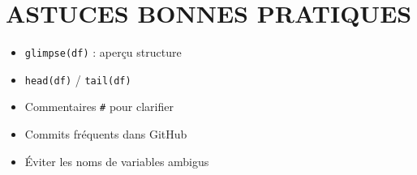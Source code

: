 \documentclass[
  french,
  8pt,
  letterpaper,
  DIV=11,
  numbers=noendperiod]{scrartcl}
\providecommand{\tightlist}{%
  \setlength{\itemsep}{0pt}\setlength{\parskip}{0pt}}
\begin{document}
\section{ ASTUCES BONNES PRATIQUES}\label{astuces-bonnes-pratiques}

\begin{itemize}
\tightlist
\item
  \texttt{glimpse(df)} : aperçu structure
\item
  \texttt{head(df)} / \texttt{tail(df)}
\item
  Commentaires \texttt{\#} pour clarifier
\item
  Commits fréquents dans GitHub
\item
  Éviter les noms de variables ambigus
\end{itemize}
\end{document}
